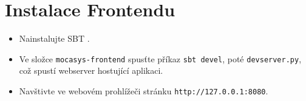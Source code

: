 \section{Instalace Frontendu}

\begin{itemize}
    \item Nainstalujte SBT \citep[viz][]{Sbt}.

    \item Ve složce \texttt{mocasys-frontend} spusťte příkaz \texttt{sbt
    devel}, poté \texttt{devserver.py}, což spustí webserver hostující
    aplikaci.

    \item Navštivte ve webovém prohlížeči stránku \texttt{http://127.0.0.1:8080}.
\end{itemize}
